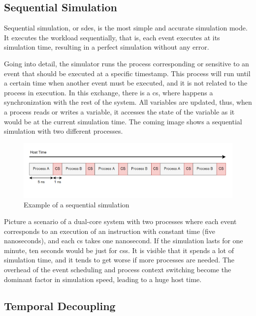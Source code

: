 \subsection{Sequential Simulation}

Sequential simulation, or \gls{sdes}, is the most simple and accurate simulation mode. It executes the workload sequentially, that is, each event 
executes at its simulation time, resulting in a perfect simulation without any error. 

Going into detail, the simulator runs the process corresponding or sensitive to an event that should be executed at a specific timestamp. This 
process will run until a certain time when another event must be executed, and it is not related to the process in execution. In this 
exchange, there is a \gls{cs}, where happens a synchronization with the rest of the system. All variables are updated, thus, when a 
process reads or writes a variable, it accesses the state of the variable as it would be at the current simulation time. The coming image shows 
a sequential simulation with two different processes.

\begin{figure}[H]
	\centering
 	\includegraphics[width=0.8\linewidth]{Images/SequentialSimulation.png}
 	\caption{Example of a sequential simulation}
	 \label{fig_SequentialSimulation}
\end{figure}

Picture a scenario of a dual-core system with two processes where each event corresponds to an execution of an instruction with constant 
time (five nanoseconds), and each \gls{cs} takes one nanosecond. If the simulation lasts for one minute, ten seconds would be just for \glspl{cs}. 
It is visible that it spends a lot of simulation time, and it tends to get worse if more processes are needed. The overhead of the event 
scheduling and process context switching become the dominant factor in simulation speed, leading to a huge host time.

\subsection{Temporal Decoupling}

